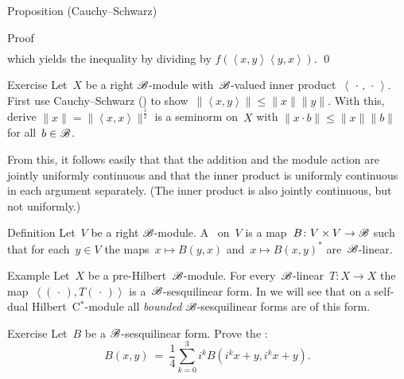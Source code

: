 \documentclass[b]{subfiles}
\begin{document}
\begin{parsec}
\begin{point}[module-CS]{Proposition (Cauchy--Schwarz)}
\begin{point}{Proof}
\begin{align*}
\end{align*}
    which yields the inequality by dividing by
$f(\left<x,y\right>\left<y,x\right>)$. \qed
\end{point}
\end{point}
\begin{point}{Exercise}
Let~$X$ be a right $\mathscr{B}$-module
    with~$\mathscr{B}$-valued inner product~$\left<\,\cdot\,,\,\cdot\,\right>$.
First use Cauchy--Schwarz ()
    to show~$\|\left<x,y\right>\| \leq \|x\|\|y\|$.
With this, derive $\|x\| =\|\left<x,x\right>\|^{\frac{1}{2}}$ is a seminorm on~$X$ with
    $\|x \cdot b \| \leq \|x\|\|b\|$
    for all~$b \in \mathscr{B}$.
\begin{point}%
From this, it follows easily that
that the addition and the module action
are jointly uniformly continuous
    and that the inner product is uniformly continuous in each argument
    separately.
(The inner product is also jointly continuous,
    but not uniformly.)
\end{point}
\end{point}
\begin{point}{Definition}%
Let~$V$ be a right $\mathscr{B}$-module.
A~ on~$V$
    is a map~$B\colon V\times V \to \mathscr{B}$
    such that for each~$y\in V$
    the maps~$x \mapsto B(y, x)$
        and~$x \mapsto B(x,y)^*$ are~$\mathscr{B}$-linear.
\end{point}
\begin{point}{Example}%
Let~$X$ be a pre-Hilbert~$\mathscr{B}$-module.
For every~$\mathscr{B}$-linear~$T\colon X \to X$
    the map~$\left<(\,\cdot\,), T (\,\cdot\,)\right>$
    is a~$\mathscr{B}$-sesquilinear form.
In 
    we will see that on a self-dual Hilbert~C$^*$-module
    all \emph{bounded}
    $\mathscr{B}$-sesquilinear forms
    are of this form.
\end{point}
\begin{point}{Exercise}%
Let~$B$ be a $\mathscr{B}$-sesquilinear form.
Prove the :
\begin{equation*}
    B(x,y) \ =\  \frac{1}{4} \sum_{k=0}^3 i^k B(i^k x + y, i^k x + y).
\end{equation*}
\end{point}
\end{parsec}
\end{document}
